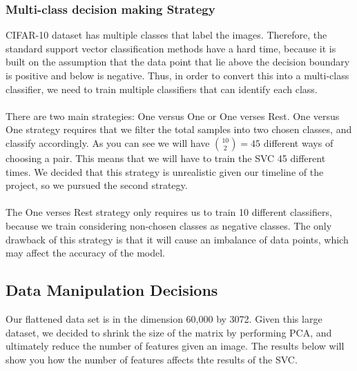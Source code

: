 \documentclass[12pt, a4paper]{article}
\begin{document}
			\subsubsection{Multi-class decision making Strategy}
				CIFAR-10 dataset has multiple classes that label the images. Therefore, the standard support vector classification methods have a hard time, because it is built on the assumption that the data point that lie above the decision boundary is positive and below is negative. Thus, in order to convert this into a multi-class classifier, we need to train multiple classifiers that can identify each class.\\\\
				There are two main strategies: One versus One or One verses Rest. One versus One strategy requires that we filter the total samples into two chosen classes, and classify accordingly. As you can see we will have ${10\choose 2}=45$ different ways of choosing a pair. This means that we will have to train the SVC 45 different times. We decided that this strategy is unrealistic given our timeline of the project, so we pursued the second strategy.\\\\
				The One verses Rest strategy only requires us to train 10 different classifiers, because we train considering non-chosen classes as negative classes. The only drawback of this strategy is that it will cause an imbalance of data points, which may affect the accuracy of the model.
		\subsection{Data Manipulation Decisions}
			Our flattened data set is in the dimension 60,000 by 3072. Given this large dataset, we decided to shrink the size of the matrix by performing PCA, and ultimately reduce the number of features given an image. The results below will show you how the number of features affects thte results of the SVC.
\end{document}
